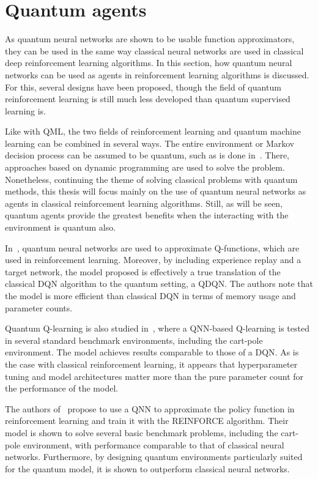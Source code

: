 \section{Quantum agents}
\label{sec:quantum_agents}

As quantum neural networks are shown to be usable function approximators, they can be used in the same way classical neural networks are used in classical deep reinforcement learning algorithms.
In this section, how quantum neural networks can be used as agents in reinforcement learning algorithms is discussed.
For this, several designs have been proposed, though the field of quantum reinforcement learning is still much less developed than quantum supervised learning is.

Like with QML, the two fields of reinforcement learning and quantum machine learning can be combined in several ways.
The entire environment or Markov decision process can be assumed to be quantum, such as is done in~\autocite{ying2021}.
There, approaches based on dynamic programming are used to solve the problem.
Nonetheless, continuing the theme of solving classical problems with quantum methods, this thesis will focus mainly on the use of quantum neural networks as agents in classical reinforcement learning algorithms.
Still, as will be seen, quantum agents provide the greatest benefits when the interacting with the environment is quantum also.

In~\autocite{chen2020}, quantum neural networks are used to approximate Q-functions, which are used in reinforcement learning.
Moreover, by including experience replay and a target network, the model proposed is effectively a true translation of the classical DQN algorithm to the quantum setting, a QDQN.
The authors note that the model is more efficient than classical DQN in terms of memory usage and parameter counts.

Quantum Q-learning is also studied in~\autocite{skolik2022}, where a QNN-based Q-learning is tested in several standard benchmark environments, including the cart-pole environment.
The model achieves results comparable to those of a DQN.
As is the case with classical reinforcement learning, it appears that hyperparameter tuning and model architectures matter more than the pure parameter count for the performance of the model.

The authors of~\autocite{jerbi2021} propose to use a QNN to approximate the policy function in reinforcement learning and train it with the REINFORCE algorithm.
Their model is shown to solve several basic benchmark problems, including the cart-pole environment, with performance comparable to that of classical neural networks.
Furthermore, by designing quantum environments particularly suited for the quantum model, it is shown to outperform classical neural networks.

